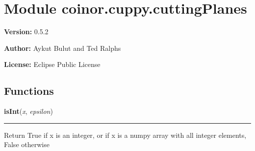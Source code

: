 %
%
%


\section{Module coinor.cuppy.cuttingPlanes}

    \label{coinor:cuppy:cuttingPlanes}
\textbf{Version:} 0.5.2



\textbf{Author:} Aykut Bulut and Ted Ralphs



\textbf{License:} Eclipse Public License





  \subsection{Functions}

    \label{coinor:cuppy:cuttingPlanes:isInt}

    \vspace{0.5ex}

\hspace{.8\funcindent}\begin{boxedminipage}{\funcwidth}

    \raggedright \textbf{isInt}(\textit{x}, \textit{epsilon})

    \vspace{-1.5ex}

    \rule{\textwidth}{0.5\fboxrule}
\setlength{\parskip}{2ex}
    Return True if x is an integer, or if x is a numpy array with all 
    integer elements, False otherwise

\setlength{\parskip}{1ex}
    \end{boxedminipage}

